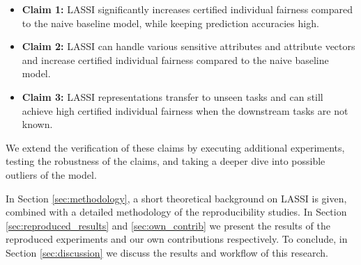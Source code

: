 \begin{itemize}
    \item \textbf{Claim 1:} LASSI significantly increases certified individual fairness compared to the naive baseline model, while keeping prediction accuracies high. 
    \item \textbf{Claim 2:} LASSI can handle various sensitive attributes and attribute vectors and increase certified individual fairness compared to the naive baseline model.
    \item \textbf{Claim 3:} LASSI representations transfer to unseen tasks and can still achieve high certified individual fairness when the downstream tasks are not known.
\end{itemize}

We extend the verification of these claims by executing additional experiments, testing the robustness of the claims, and taking a deeper dive into possible outliers of the model. \newline


In Section \ref{sec:methodology}, a short theoretical background on LASSI is given, combined with a detailed methodology of the reproducibility studies. In Section \ref{sec:reproduced_results} and \ref{sec:own_contrib} we present the results of the reproduced experiments and our own contributions respectively. To conclude, in Section \ref{sec:discussion} we discuss the results and workflow of this research.



